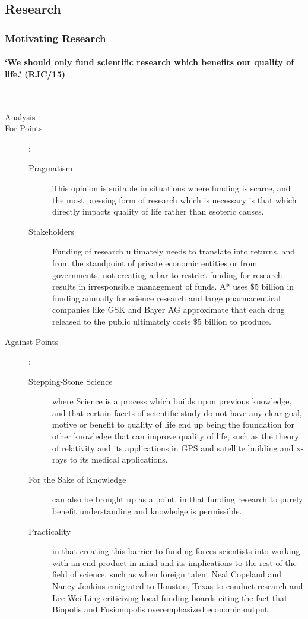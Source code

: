 \documentclass[../../main]{subfiles}
\begin{document}
\subsection{Research}

\subsubsection{Motivating Research}

\paragraph{`We should only fund scientific research which benefits our quality of life.' (RJC/15)}-

\begin{description}
	\item[Analysis]
	\item[For Points] :
		\begin{description}
			\item[Pragmatism] This opinion is suitable in situations where funding is scarce, and the most pressing form of research which is necessary is that which directly impacts quality of life rather than esoteric causes.
			\item[Stakeholders] Funding of research ultimately needs to translate into returns, and from the standpoint of private economic entities or from governments, not creating a bar to restrict funding for research results in irresponsible management of funds. A* uses \$5 billion in funding annually for science research and large pharmaceutical companies like GSK and Bayer AG approximate that each drug released to the public ultimately costs \$5 billion to produce.
		\end{description}
	\item[Against Points] :
		\begin{description}
			\item[Stepping-Stone Science] where Science is a process which builds upon previous knowledge, and that certain facets of scientific study do not have any clear goal, motive or benefit to quality of life end up being the foundation for other knowledge that can improve quality of life, such as the theory of relativity and its applications in GPS and satellite building and x-rays to its medical applications.
			\item[For the Sake of Knowledge] can also be brought up as a point, in that funding research to purely benefit understanding and knowledge is permissible.
			\item[Practicality] in that creating this barrier to funding forces scientists into working with an end-product in mind and its implications to the rest of the field of science, such as when foreign talent Neal Copeland and Nancy Jenkins emigrated to Houston, Texas to conduct research and Lee Wei Ling criticizing local funding boards citing the fact that Biopolis and Fusionopolis overemphasized economic output.
		\end{description}
\end{description}
\end{document}
